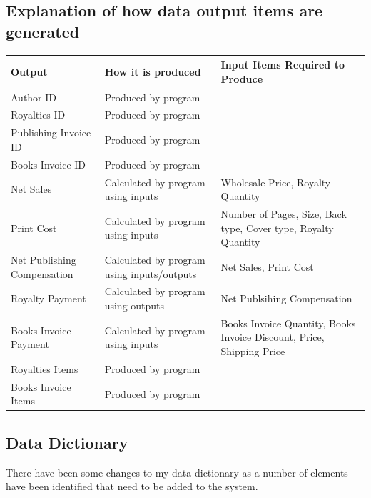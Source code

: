 \subsection{Explanation of how data output items are generated}

\begin{center}
\begin{tabular}{|p{2cm}|p{2cm}|p{2.5cm}|}
    \hline
    \textbf{Output} & \textbf{How it is produced} & \textbf{Input Items Required to Produce} \\ \hline
    Author ID & Produced by program & \\ \hline
    Royalties ID & Produced by program & \\ \hline
    Publishing Invoice ID & Produced by program & \\ \hline
    Books Invoice ID & Produced by program & \\ \hline
    Net Sales & Calculated by program using inputs & Wholesale Price, Royalty Quantity \\ \hline
    Print Cost & Calculated by program using inputs & Number of Pages, Size, Back type, Cover type, Royalty Quantity \\ \hline
    Net Publishing Compensation & Calculated by program using inputs/outputs & Net Sales, Print Cost \\ \hline
    Royalty Payment & Calculated by program using outputs & Net Publsihing Compensation \\ \hline
    Books Invoice Payment & Calculated by program using inputs & Books Invoice Quantity, Books Invoice Discount, Price, Shipping Price \\ \hline
    Royalties Items & Produced by program & \\ \hline
    Books Invoice Items & Produced by program & \\ \hline
\end{tabular}
\end{center}


\subsection{Data Dictionary}

There have been some changes to my data dictionary as a number of elements have been identified that need to be added to the system.

